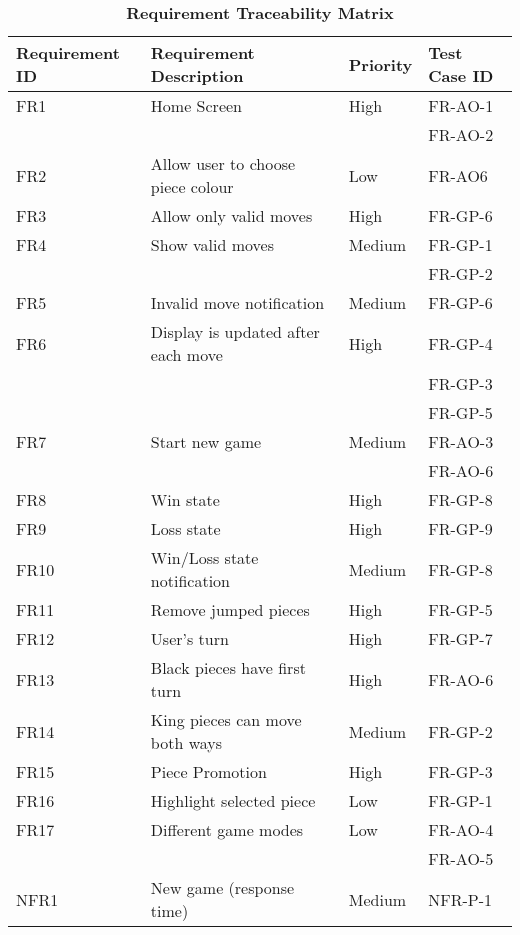 \documentclass[12pt, titlepage]{article}
\begin{document}
\begin{table}[htbp]
    \begin{center}
	\caption{\bf Requirement Traceability Matrix}
	\begin{adjustwidth}{-1.5cm}{}
	\begin{tabularx}{1.2\textwidth}{|p{3.4cm}|p{7cm}|p{1.6cm}|X|}
		\hline 
		{\bf Requirement ID}  & {\bf Requirement Description} & {\bf Priority} & {\bf Test Case ID} \\
		\hline
		FR1 & Home Screen & High & FR-AO-1\\
		& & & FR-AO-2\\
		\hline
		FR2 & Allow user to choose piece colour & Low & FR-AO6\\
		\hline
		FR3 & Allow only valid moves & High & FR-GP-6\\
		\hline
		FR4 & Show valid moves & Medium & FR-GP-1\\
		& & & FR-GP-2\\
		\hline
		FR5 & Invalid move notification & Medium & FR-GP-6\\
		\hline
		FR6 & Display is updated after each move & High & FR-GP-4\\
		& & & FR-GP-3\\
		& & & FR-GP-5\\
		\hline
		FR7 & Start new game & Medium & FR-AO-3\\
		& & & FR-AO-6\\
		\hline
		FR8 & Win state & High & FR-GP-8 \\
		\hline
		FR9 & Loss state & High & FR-GP-9 \\
		\hline
		FR10 & Win/Loss state notification & Medium & FR-GP-8 \\
		\hline
		FR11 & Remove jumped pieces & High & FR-GP-5\\
		\hline
		FR12 & User's turn & High & FR-GP-7\\
		\hline
		FR13 & Black pieces have first turn & High &  FR-AO-6\\
		\hline
		FR14 & King pieces can move both ways & Medium & FR-GP-2\\
		\hline
		FR15 & Piece Promotion & High & FR-GP-3\\
		\hline
		FR16 & Highlight selected piece & Low & FR-GP-1\\
		\hline
		FR17 & Different game modes & Low & FR-AO-4\\
	     &  &  & FR-AO-5\\
		\hline
		\hline
		NFR1 & New game (response time) & Medium & NFR-P-1 \\

\end{tabularx}
\end{adjustwidth}
\end{center}
\end{table}
\end{document}
